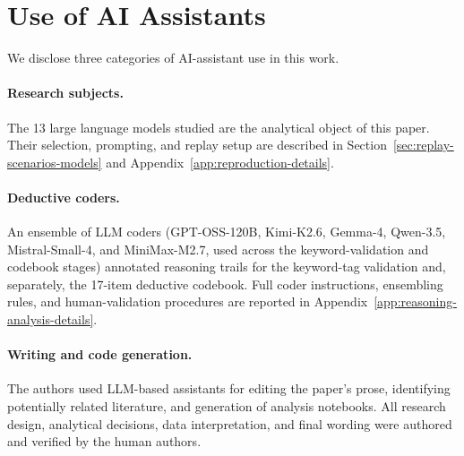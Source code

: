 \section{Use of AI Assistants}
\label{app:ai-assistant-use}

We disclose three categories of AI-assistant use in this work.

\paragraph{Research subjects.} The 13 large language models studied are the analytical object of this paper. Their selection, prompting, and replay setup are described in Section~\ref{sec:replay-scenarios-models} and Appendix~\ref{app:reproduction-details}.

\paragraph{Deductive coders.} An ensemble of LLM coders (GPT-OSS-120B, Kimi-K2.6, Gemma-4, Qwen-3.5, Mistral-Small-4, and MiniMax-M2.7, used across the keyword-validation and codebook stages) annotated reasoning trails for the keyword-tag validation and, separately, the 17-item deductive codebook. Full coder instructions, ensembling rules, and human-validation procedures are reported in Appendix~\ref{app:reasoning-analysis-details}.

\paragraph{Writing and code generation.} The authors used LLM-based assistants for editing the paper's prose, identifying potentially related literature, and generation of analysis notebooks. All research design, analytical decisions, data interpretation, and final wording were authored and verified by the human authors.
